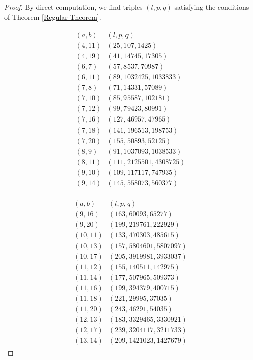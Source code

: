 \documentclass{amsart}
\theoremstyle{theorem}
\theoremstyle{definition}
\begin{document}
\begin{proof}
By direct computation, we find triples $(l, p, q)$ satisfying the conditions of Theorem \ref{Regular Theorem}.
	
\begin{minipage}[t]{.5\textwidth}
	\begin{align*}
    	\begin{array}{l|l}
        (a,b) & (l, p, q) \\ \hline
        (4, 11) & (25, 107, 1425) \\
		(4, 19) & (41, 14745, 17305) \\
		(6, 7) & (57,  8537,  70987) \\
		(6, 11) & (89,  1032425,  1033833) \\
		(7, 8) & (71,  14331,  57089) \\
		(7, 10) & (85,  95587,  102181) \\
		(7, 12) & (99,  79423,  80991) \\
		(7, 16) & (127,  46957,  47965) \\
		(7, 18) & (141,  196513,  198753) \\
		(7, 20) & (155,  50893,  52125) \\
		(8, 9) & (91,  1037093,  1038533) \\
		(8, 11) & (111,  2125501,  4308725) \\
		(9, 10) & (109,  117117,  747935) \\
        (9, 14) & (145,  558073,  560377)
        \end{array}
	\end{align*}
\end{minipage}%
\begin{minipage}[t]{0.5\textwidth}
	\begin{align*}
    	\begin{array}{l|lcl|l}
        (a,b) & (l, p, q) \\ \hline
        (9, 16) & (163,  60093,  65277) \\
		(9, 20) & (199,  219761,  222929) \\
		(10, 11) & (133,  470303,  485615) \\
		(10, 13) & (157,  5804601,  5807097) \\
		(10, 17) & (205,  3919981,  3933037) \\
		(11, 12) & (155,  140511,  142975) \\
		(11, 14) & (177,  507965,  509373) \\
		(11, 16) & (199,  394379,  400715) \\
		(11, 18) & (221,  29995,  37035) \\
		(11, 20) & (243,  46291,  54035) \\
		(12, 13) & (183,  3329465,  3330921) \\
		(12, 17) & (239,  3204117,  3211733) \\
		(13, 14) & (209,  1421023,  1427679)
        \end{array}
    \end{align*}
\end{minipage}


\end{proof}
\end{document}
